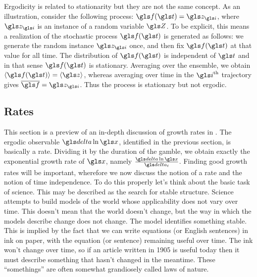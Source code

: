 
Ergodicity is related to stationarity but they are not the same concept. As an illustration, consider the following process: $\gf(\t)=\z_{\gi}$, where $\z_{\gi}$ is an instance of a random variable $\Z$. To be explicit, this means a realization of the stochastic process $\gf(\t)$ is generated as follows: we generate the random instance $\z_{\gi}$ once, and then fix $\gf(\t)$ at that value for all time. The distribution of $\gf(\t)$ is independent of $\t$ and in that sense $\gf(\t)$ is stationary. Averaging over the ensemble, we obtain $\ave{\gf(\t)}=\ave{\z}$, whereas averaging over time in the $\gi^{\text{th}}$ trajectory gives $\overline{\gf}=\z_{\gi}$. Thus the process is stationary but not ergodic.

\subsection{Rates}
This section is a preview of an in-depth discussion of growth rates in .
The ergodic observable $\d \ln \x$, identified in the previous section, is basically a rate.
Dividing it by the duration of the gamble, we obtain exactly the exponential 
growth rate of $\x$, namely $\frac{\d \ln \x}{\dt}$. Finding good growth rates 
will be important, wherefore we now discuss the notion of a rate and 
the notion of time independence. 
To do this properly let's think about the basic task of science. This may be described as the 
search for stable structure. Science attempts to build models of the world 
whose applicability does not vary over time. This doesn't mean that the world doesn't change, 
but the way in which the models describe change does not change. The model identifies
something stable. This is implied by the fact that we can write 
equations (or English sentences) in ink on paper, with the equation (or sentence) remaining 
useful over time. The ink won't change over time, so
if an article written in 1905 is useful today then it must describe something that hasn't 
changed in the meantime. These ``somethings'' are often somewhat 
grandiosely called laws of nature.

